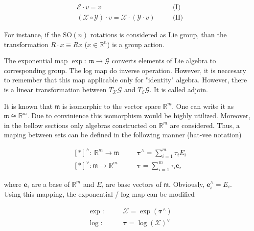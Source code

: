 \begin{equation}
    \begin{aligned}
        \label{eqn:act_axi}
        & \mathcal{E} \cdot v = v \quad && \text{(I)} \\
        & (\mathcal{X} \circ \mathcal{Y}) \cdot v = 
        \mathcal{X} \cdot (\mathcal{Y} \cdot v) \quad && \text{(II)}
    \end{aligned}
\end{equation}

For instance, if the $\text{SO}(n)$ rotations is considered as Lie group, than the 
transformation $R \cdot x \equiv R x$ ($x \in \mathbb{R}^n$) is a group action.

The exponential map $\exp:\ \mathfrak{m} \to \mathcal{G}$ converts elements of 
Lie algebra to corresponding group. The log map do inverse operation. 
However, it is neccesary to remember that 
this map applicable only for "identity" algebra. However, there is a linear
transformation between $T_{\mathcal{X}} \mathcal{G}$ and $T_{\mathcal{E}} 
\mathcal{G}$. It is called adjoin.

It is known that $\mathfrak{m}$ is isomorphic to the vector space $\mathbb{R}^m$. 
One can write it as $\mathfrak{m} \cong \mathbb{R}^m$. Due to convinience this 
isomorphism would be highly utilized. Moreover, in the bellow sections only 
algebras constructed on $\mathbb{R}^m$ are considered. Thus, a maping between 
sets can be defined in the following manner (hat-vee notation)

\begin{equation}
    \begin{aligned}
        \label{eqn:hat_vee_not}
        & [*]^\wedge: \ \mathbb{R}^m \to \mathfrak{m} \quad &&
        \boldsymbol{\tau}^\wedge = \sum_{i=1}^{m} \tau_i E_i \\
        & [*]^\vee: \mathfrak{m} \to \mathbb{R}^m \quad && 
        \boldsymbol{\tau} = \sum_{i=1}^{m} \tau_i \mathbf{e}_i
    \end{aligned}
\end{equation}

where $\mathbf{e}_i$ are a base of $\mathbb{R}^m$ and $E_i$ are base vectors 
of $\mathfrak{m}$. Obviously, $\mathbf{e}_i^\wedge = E_i$. Using this mapping, the
exponential / log map can be modified 

\begin{equation}
    \begin{aligned}
        \label{eqn:exp_log_for_r_m}
        & \exp : \quad && \mathcal{X} = \exp(\boldsymbol{\tau}^\wedge) \\
        & \log : \quad && \boldsymbol{\tau} = \log(\mathcal{X})^\vee
    \end{aligned}
\end{equation}

